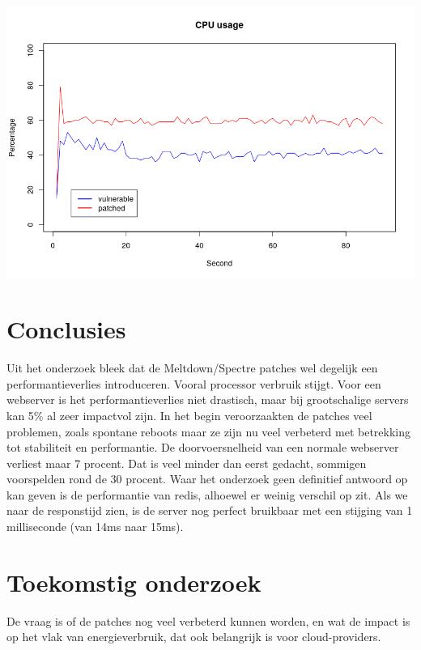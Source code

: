 \documentclass[a0,portrait]{a0poster}
\begin{document}
\begin{multicols}{2}
\begin{center}\vspace{1cm}
\includegraphics[width=1.0\linewidth]{cpu_usage.png}
\end{center}\vspace{1cm}




\color{HoGentAccent1} 
\section*{Conclusies}
\color{black}
Uit het onderzoek bleek dat de Meltdown/Spectre patches wel degelijk een performantieverlies introduceren. Vooral processor verbruik stijgt. Voor een webserver is het
performantieverlies niet drastisch, maar bij grootschalige servers kan 5\% al zeer impactvol zijn.\newline
In het begin veroorzaakten de patches veel problemen, zoals spontane reboots maar ze zijn nu veel verbeterd met betrekking tot stabiliteit en performantie. De doorvoersnelheid van een normale webserver verliest maar 7 procent. Dat is veel minder dan eerst gedacht, sommigen voorspelden rond de 30 procent.\newline
Waar het onderzoek geen definitief antwoord op kan geven is de performantie van redis, alhoewel er weinig verschil op zit. Als we naar de responstijd zien, is de server nog perfect bruikbaar met een stijging van 1 milliseconde (van 14ms naar 15ms).
\color{HoGentAccent1} 
\section*{Toekomstig onderzoek}
\color{black}

De vraag is of de patches nog veel verbeterd kunnen worden, en wat de impact is op het
vlak van energieverbruik, dat ook belangrijk is voor cloud-providers.



\end{multicols}
\end{document}
